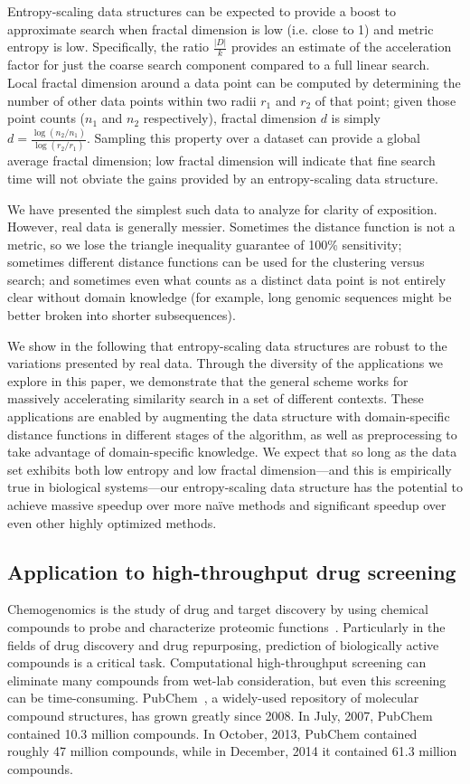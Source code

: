 \documentclass[review,preprint,12pt]{elsarticle}
\renewcommand{\cite}{\citep} %
\theoremstyle{definition}
\theoremstyle{remark}
\numberwithin{equation}{section}
\begin{document}
Entropy-scaling data structures can be expected to provide a boost to 
approximate search when fractal dimension is low (i.e. close to 1) and metric
entropy is low.
Specifically, the ratio $\frac{|D|}{k}$ provides an estimate of the acceleration factor
for just the coarse search component compared to a full linear search.
Local fractal dimension around a data point can be computed by determining the
number of other data points within two radii $r_1$ and $r_2$ of that point;
given those point counts ($n_1$ and $n_2$ respectively), fractal dimension $d$
is simply $d=\frac{\log (n_2 / n_1)}{ \log (r_2 / r_1)}$.
Sampling this property over a dataset can provide a global average fractal 
dimension; low fractal dimension will indicate that fine search time will not
obviate the gains provided by an entropy-scaling data structure.

We have presented the simplest such data to analyze for clarity of exposition.
However, real data is generally messier.
Sometimes the distance function is not a metric, so we lose the triangle inequality guarantee of 100\% sensitivity;
sometimes different distance functions can be used for the clustering versus search;
and sometimes even what counts as a distinct data point is not entirely clear without domain knowledge (for example, long genomic sequences might be better broken into shorter subsequences).

We show in the following that entropy-scaling data structures are robust to the variations presented by real data.
Through the diversity of the applications we explore in this paper, we demonstrate that the general scheme works for massively accelerating similarity search in a set of different contexts.
These applications are enabled by augmenting the data structure with domain-specific distance functions in different stages of the algorithm, as well as preprocessing to take advantage of domain-specific knowledge.
We expect that so long as the data set exhibits both low entropy and low 
fractal dimension---and this is empirically true in biological systems---our 
entropy-scaling data structure has the potential to achieve massive speedup 
over more na\"ive methods and significant speedup over even other highly 
optimized methods.

\subsection{Application to high-throughput drug screening}

Chemogenomics is the study of drug and target discovery by using chemical
compounds to probe and characterize proteomic 
functions~\cite{bredel2004chemogenomics}.
Particularly in the fields of drug discovery and drug repurposing, prediction 
of biologically active compounds is a critical task. 
Computational high-throughput screening can eliminate many compounds from 
wet-lab consideration, but even this screening can be time-consuming.
PubChem~\cite{bolton2008pubchem}, a widely-used repository of molecular compound 
structures, 
has grown greatly since 2008. 
In July, 2007, PubChem contained 10.3 million compounds.
In October, 2013, PubChem contained roughly 47 million compounds, while
in December, 2014 it contained 61.3 million compounds.
\end{document}
